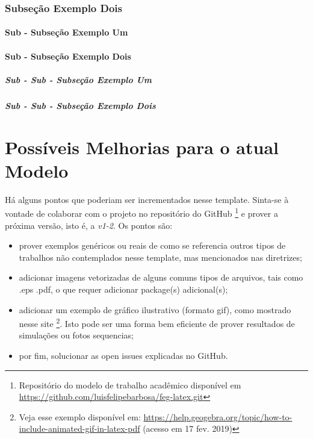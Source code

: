 \documentclass[
  12pt,		%
  a4paper,	%
  openright,%
  oneside,	%
  chapter=TITLE,		%
  section=TITLE,		%
  english,	%
  french,	%
  spanish,	%
  brazil
]{abntex2}
\begin{document}
                \subsection{Subseção Exemplo Dois}
                \lipsum[7]
                
                    \subsubsection{Sub - Subseção Exemplo Um}
                    \lipsum[6]
                    
                    \subsubsection{Sub - Subseção Exemplo Dois}
                    \lipsum[12]
                    
                        \paragraph{Sub - Sub - Subseção Exemplo Um}
                        \lipsum[11]
                        
                        \paragraph{Sub - Sub - Subseção Exemplo Dois}
                        \lipsum[13]

     \chapter{Possíveis Melhorias para o atual Modelo}
        
        Há alguns pontos que poderiam ser incrementados nesse template. Sinta-se à vontade de colaborar com o projeto no repositório do GitHub \footnote{Repositório do modelo de trabalho acadêmico disponível em \url{https://github.com/luisfelipebarbosa/feg-latex.git}} e prover a próxima versão, isto é, a \emph{v1-2}. Os pontos são:
        
        
        \begin{itemize}
            \item prover exemplos genéricos ou reais de como se referencia outros tipos de trabalhos não contemplados nesse template, mas mencionados nas diretrizes;
            \item adicionar imagens vetorizadas de alguns comuns tipos de arquivos, tais como .eps .pdf, o que requer  adicionar  package(s) adicional(s);
            \item adicionar um exemplo de gráfico ilustrativo (formato gif), como mostrado nesse site \footnote{Veja esse exemplo disponível em: \url{https://help.geogebra.org/topic/how-to-include-animated-gif-in-latex-pdf} (acesso em 17 fev. 2019)}. Isto pode ser uma forma bem eficiente de prover resultados de simulações ou fotos sequencias;
            \item por fim, solucionar as open issues explicadas no GitHub.
        \end{itemize}
     
\end{document}
